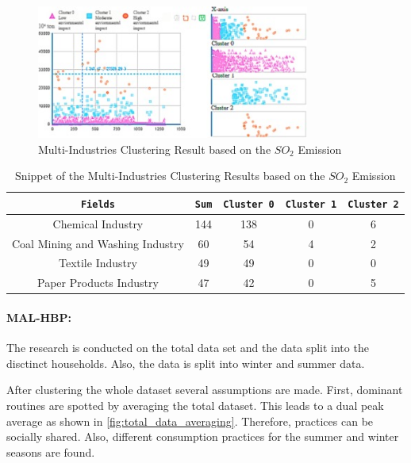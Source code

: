 \begin{figure}
    \centering
    \includegraphics[width=0.8\textwidth]{figures/liu_assessmentOfIndustries/liu_environmentalPerformance.jpg}
    \caption{Multi-Industries Clustering Result based on the $SO_2$ Emission \cite{LIU-BDE}}
    \label{fig:multi_industries_clustering_result_environemental_performance}
\end{figure}

\begin{table}[h]
    \centering
    \begin{tabular}{c|c|c|c|c}
        \texttt{Fields} & \texttt{Sum} & \texttt{Cluster 0} & \texttt{Cluster 1} & \texttt{Cluster 2} \\
        \hline
        Chemical Industry & 144 & 138 & 0 & 6 \\
        Coal Mining and Washing Industry & 60 & 54 & 4 & 2 \\
        Textile Industry & 49 & 49 & 0 & 0 \\
        Paper Products Industry & 47 & 42 & 0 & 5 \\
    \end{tabular}
    \caption{Snippet of the Multi-Industries Clustering Results based on the $SO_2$ Emission \cite{LIU-BDE}}
    \label{tab:multi_industries_clustering_results_based_on_the_so2_emission}
\end{table}

\paragraph*{MAL-HBP:}
The research is conducted on the total data set and the data split into the disctinct households.
Also, the data is split into winter and summer data.

After clustering the whole dataset several assumptions are made.
First, dominant routines are spotted by averaging the total dataset.
This leads to a dual peak average as shown in \autoref{fig:total_data_averaging}.
Therefore, practices can be socially shared.
Also, different consumption practices for the summer and winter seasons are found.

